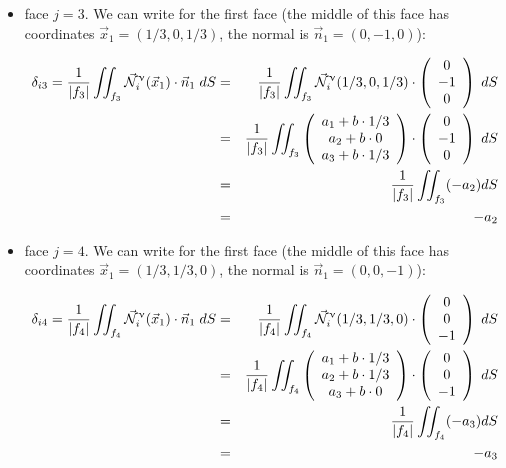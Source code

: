 \begin{itemize}
\item face $j=3$. We can write for the first face (the middle of this face has coordinates 
$\vec{x}_1=(1/3,0,1/3)$, the normal is $\vec{n}_1=(0,-1,0)$):

\begin{eqnarray}
\delta_{i3}=
\frac{1}{|f_3|} \iint_{f_3}
\vec{{\mathcal{N}}}^\upnu_i( \vec{x}_1) \cdot \vec{n}_1 \; dS
&=&\frac{1}{|f_3|} \iint_{f_3} \vec{{\mathcal{N}}}^\upnu_i( 1/3,0,1/3) \cdot 
\left(\begin{array}{c} 0\\-1\\0 \end{array}\right) \; dS \nonumber\\
&=& \frac{1}{|f_3|} \iint_{f_3} 
\left(\begin{array}{c} a_1+b\cdot 1/3 \\ a_2 + b \cdot 0 \\ a_3 + b \cdot 1/3 \end{array}\right)
\cdot  \left(\begin{array}{c} 0\\-1\\0 \end{array}\right) \; dS \nonumber\\
&=& \frac{1}{|f_3|} \iint_{f_3} (-a_2) dS \nonumber\\
&=& -a_2
\end{eqnarray}



\item face $j=4$. We can write for the first face (the middle of this face has coordinates 
$\vec{x}_1=(1/3,1/3,0)$, the normal is $\vec{n}_1=(0,0,-1)$):

\begin{eqnarray}
\delta_{i4}=
\frac{1}{|f_4|} \iint_{f_4}
\vec{{\mathcal{N}}}^\upnu_i( \vec{x}_1) \cdot \vec{n}_1 \; dS
&=&\frac{1}{|f_4|} \iint_{f_4} \vec{{\mathcal{N}}}^\upnu_i( 1/3,1/3,0) \cdot 
\left(\begin{array}{c} 0\\0\\-1 \end{array}\right) \; dS \nonumber\\
&=& \frac{1}{|f_4|} \iint_{f_4} 
\left(\begin{array}{c} a_1+b\cdot 1/3 \\ a_2 + b \cdot 1/3 \\ a_3 + b \cdot  0\end{array}\right)
\cdot  \left(\begin{array}{c} 0\\0\\-1 \end{array}\right) \; dS \nonumber\\
&=& \frac{1}{|f_4|} \iint_{f_4} (-a_3) dS \nonumber\\
&=& -a_3
\end{eqnarray}

\end{itemize}




